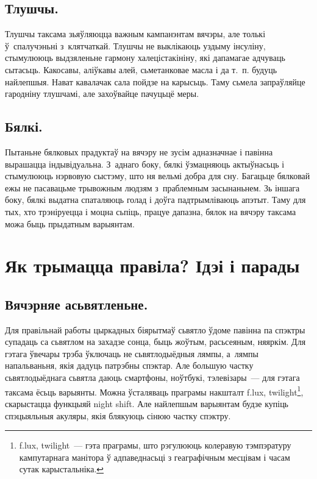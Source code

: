 \subsection{Тлушчы.}
Тлушчы таксама зьяўляюцца важным кампанэнтам вячэры, але толькі ў~спалучэньні з~клятчаткай. Тлушчы не выклікаюць уздыму інсуліну, стымулююць выдзяленьне гармону халецістакініну, які дапамагае адчуваць сытасьць. Какосавы, аліўкавы алей, сьметанковае масла і да т.~п. будуць найлепшыя. Нават кавалачак сала пойдзе на карысьць. Таму сьмела запраўляйце гародніну тлушчамі, але захоўвайце пачуцьцё меры.


\subsection{Бялкі.}
Пытаньне бялковых прадуктаў на вячэру не зусім адназначнае і павінна вырашацца індывідуальна. З~аднаго боку, бялкі ўзмацняюць актыўнасьць і стымулююць нэрвовую сыстэму, што ня вельмі добра для сну. Багацьце бялковай ежы не пасавацьме трывожным людзям з~праблемным засынаньнем. Зь іншага боку, бялкі выдатна спаталяюць голад і доўга падтрымліваюць апэтыт. Таму для тых, хто трэніруецца і моцна сьпіць, працуе дапазна, бялок на вячэру таксама можа быць прыдатным варыянтам.

\section{Як трымацца правіла? Ідэі і парады}

\subsection{Вячэрняе асьвятленьне.}
Для правільнай работы цыркадных біярытмаў сьвятло ўдоме павінна па спэктры супадаць са сьвятлом на захадзе сонца, быць жоўтым, расьсеяным, няяркім. Для гэтага ўвечары трэба ўключаць не сьвятлодыёдныя лямпы, а~лямпы напальваньня, якія дадуць патрэбны спэктар. Але большую частку сьвятлодыёднага сьвятла даюць смартфоны, ноўтбукі, тэлевізары~--- для гэтага таксама ёсьць варыянты. Можна ўсталяваць праграмы накшталт f.lux, twilight\footnote{f.lux, twilight~--- гэта праграмы, што рэгулююць колеравую тэмпэратуру кампутарнага манітора ў адпаведнасьці з геаграфічным месцівам і часам сутак карыстальніка.}, скарыстацца функцыяй night shift. Але найлепшым варыянтам будзе купіць спэцыяльныя акуляры, якія блякуюць сінюю частку спэктру.

